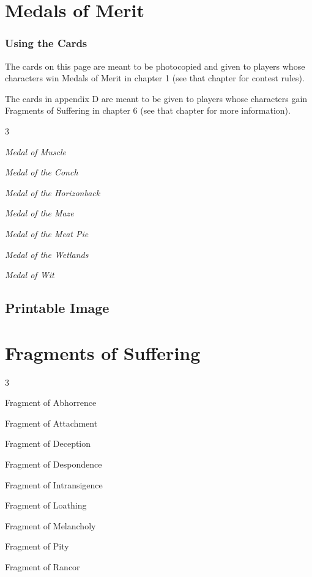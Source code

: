 \documentclass[10pt,a4paper,twoside,fancy,bg=print,twocolumn,openany,nodeprecatedcode]{dndbook}
\begin{document}
\chapter{Medals of Merit}
\subsection{Using the Cards}
The cards on this page are meant to be photocopied and given to players whose characters win Medals of Merit in chapter 1 (see that chapter for contest rules).

The cards in appendix D are meant to be given to players whose characters gain Fragments of Suffering in chapter 6 (see that chapter for more information).


\begin{itemize}
\begin{multicols}{3}
\item \textit{Medal of Muscle}
\item \textit{Medal of the Conch}
\item \textit{Medal of the Horizonback}
\item \textit{Medal of the Maze}
\item \textit{Medal of the Meat Pie}
\item \textit{Medal of the Wetlands}
\item \textit{Medal of Wit}
\end{multicols}

\end{itemize}

\section{Printable Image}
\chapter{Fragments of Suffering}

\begin{itemize}
\begin{multicols}{3}
\item Fragment of Abhorrence
\item Fragment of Attachment
\item Fragment of Deception
\item Fragment of Despondence
\item Fragment of Intransigence
\item Fragment of Loathing
\item Fragment of Melancholy
\item Fragment of Pity
\item Fragment of Rancor
\end{multicols}

\end{itemize}
\end{document}
